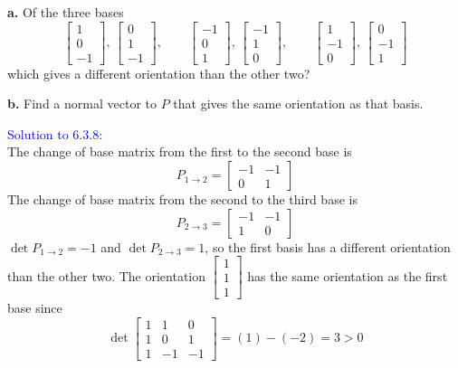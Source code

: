 \documentclass[12pt]{article}
\begin{document}
{\textbf{a.} Of the three bases
\begin{equation*}
        \begin{bmatrix}
        1\\0\\-1
    \end{bmatrix},\,
     \begin{bmatrix}
        0\\1\\-1
    \end{bmatrix} ,\qquad
        \begin{bmatrix}
        -1\\0\\1
    \end{bmatrix},\,
     \begin{bmatrix}
        -1\\1\\0
    \end{bmatrix} ,\qquad
            \begin{bmatrix}
        1\\-1\\0
    \end{bmatrix},\,
     \begin{bmatrix}
        0\\-1\\1
    \end{bmatrix}
\end{equation*}
which gives a different orientation than the other two? \medskip

\textbf{b.}
Find a normal vector to $P$ that gives the same orientation as that basis.\medskip

\textcolor{blue}{Solution to 6.3.8:} \\
    The change of base matrix from the first to the second base is 
    \[
        P_{1 \to 2} = \begin{bmatrix}
            -1 & -1\\
            0 & 1
        \end{bmatrix}
    \]
    The change of base matrix from the second to the third base is 
    \[
        P_{2 \to 3} = \begin{bmatrix}
            -1 & -1\\
            1 & 0
        \end{bmatrix}
    \]
    $\det P_{1\to 2} = -1$ and $\det P_{2\to 3} = 1$, so the first basis 
    has a different orientation than the other two.
    The orientation 
    $\begin{bmatrix}
        1 \\ 1 \\ 1
    \end{bmatrix}$
    has the same orientation as the first base since
    \[
        \det \begin{bmatrix}
            1 & 1 & 0 \\
            1 & 0 & 1 \\
            1 & -1 & -1
        \end{bmatrix} 
        = (1) - (-2)
        = 3 > 0
    \]
\newpage

}
\end{document}
